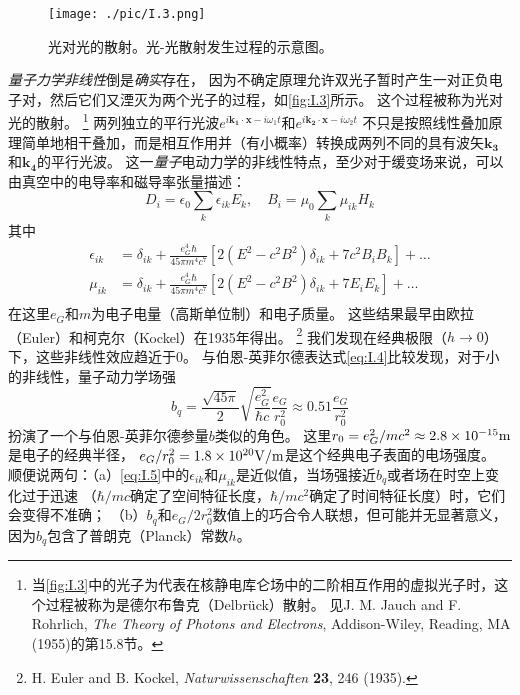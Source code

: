 \documentclass[12pt]{book}
\numberwithin{equation}{chapter}
\numberwithin{figure}{chapter}
\numberwithin{footnote}{page}
\begin{document}
\begin{figure}[!ht]
    \centering
    \texttt{[image: ./pic/I.3.png]}
    \captionsetup{justification=raggedright, singlelinecheck=false}
    \caption{光对光的散射。光-光散射发生过程的示意图。}
    \label{fig:I.3}
\end{figure}

\textit{量子力学非线性}倒是\textit{确实}存在，
因为不确定原理允许双光子暂时产生一对正负电子对，然后它们又湮灭为两个光子的过程，如\autoref{fig:I.3}所示。
这个过程被称为光对光的散射。
\footnote{当\autoref{fig:I.3}中的光子为代表在核静电库仑场中的二阶相互作用的虚拟光子时，这个过程被称为是德尔布鲁克（Delbrück）散射。
    见J. M. Jauch and F. Rohrlich, \textit{The Theory of Photons and Electrons}, Addison-Wiley, Reading, MA (1955)的第15.8节。}
两列独立的平行光波$e^{i\mathbf{k_1}\cdot\mathbf{x}-i\omega_1 t}$和$e^{i\mathbf{k_2}\cdot\mathbf{x}-i\omega_2 t}$
不只是按照线性叠加原理简单地相干叠加，而是相互作用并（有小概率）转换成两列不同的具有波矢$\mathbf{k_3}$和$\mathbf{k_4}$的平行光波。
这一\textit{量子}电动力学的非线性特点，至少对于缓变场来说，可以由真空中的电导率和磁导率张量描述：
$$D_i=\epsilon_0 \sum_{k}\epsilon_{ik}E_k, \quad B_i=\mu_0 \sum_{k}\mu_{ik}H_k$$
其中
\begin{equation}\label{eq:I.5}
    \begin{aligned}
        \epsilon_{ik} & =\delta_{ik}+\frac{e_G^4\hbar}{45\pi m^4 c^7}[2(E^2-c^2B^2)\delta_{ik}+7c^2B_iB_k]+\dots \\
        \mu_{ik}      & =\delta_{ik}+\frac{e_G^4\hbar}{45\pi m^4 c^7}[2(E^2-c^2B^2)\delta_{ik}+7E_iE_k]+\dots    \\
    \end{aligned}
\end{equation}
在这里$e_G$和$m$为电子电量（高斯单位制）和电子质量。
这些结果最早由欧拉（Euler）和柯克尔（Kockel）在1935年得出。
\footnote{H. Euler and B. Kockel, \textit{Naturwissenschaften} \textbf{23}, 246 (1935).}
我们发现在经典极限（$h\to 0$）下，这些非线性效应趋近于0。
与伯恩-英菲尔德表达式\autoref{eq:I.4}比较发现，对于小的非线性，量子动力学场强
$$b_q=\frac{\sqrt{45\pi}}{2}\sqrt{\frac{e_G^2}{\hbar c}}\frac{e_G}{r_0^2}\approx 0.51\frac{e_G}{r_0^2}$$
扮演了一个与伯恩-英菲尔德参量$b$类似的角色。
这里$r_0=e_G^2/mc^2\approx 2.8\times 10^{-15}{\rm m}$是电子的经典半径，
$e_G/r_0^2=1.8\times 10^{20}{\rm V/m}$是这个经典电子表面的电场强度。
顺便说两句：（a）\autoref{eq:I.5}中的$\epsilon_{ik}$和$\mu_{ik}$是近似值，当场强接近$b_q$或者场在时空上变化过于迅速
（$\hbar/mc$确定了空间特征长度，$\hbar/mc^2$确定了时间特征长度）时，它们会变得不准确；
（b）$b_q$和$e_G/2r_0^2$数值上的巧合令人联想，但可能并无显著意义，因为$b_q$包含了普朗克（Planck）常数$h$。
\end{document}
